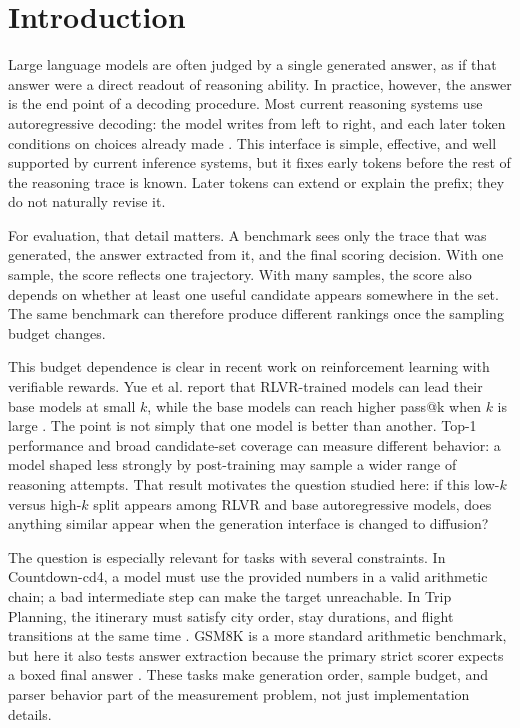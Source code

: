 \section{Introduction}
\label{sec:introduction}

Large language models are often judged by a single generated answer, as if that
answer were a direct readout of reasoning ability. In practice, however, the
answer is the end point of a decoding procedure. Most current reasoning systems
use autoregressive decoding: the model writes from left to right, and each later
token conditions on choices already made
\cite{vaswani2017attention,brown2020language}. This interface is simple,
effective, and well supported by current inference systems, but it fixes early
tokens before the rest of the reasoning trace is known. Later tokens can extend
or explain the prefix; they do not naturally revise it.

For evaluation, that detail matters. A benchmark sees only the trace that was
generated, the answer extracted from it, and the final scoring decision. With
one sample, the score reflects one trajectory. With many samples, the score also
depends on whether at least one useful candidate appears somewhere in the set.
The same benchmark can therefore produce different rankings once the sampling
budget changes.

This budget dependence is clear in recent work on reinforcement learning with
verifiable rewards. Yue et al. report that RLVR-trained models can lead their
base models at small $k$, while the base models can reach higher pass@k when
$k$ is large \cite{yue2025rlvr}. The point is not simply that one model is
better than another. Top-1 performance and broad candidate-set coverage can
measure different behavior: a model shaped less strongly by post-training may
sample a wider range of reasoning attempts. That result motivates the question
studied here: if this low-$k$ versus high-$k$ split appears among RLVR and base
autoregressive models, does anything similar appear when the generation
interface is changed to diffusion?

The question is especially relevant for tasks with several constraints. In
Countdown-cd4, a model must use the provided numbers in a valid arithmetic
chain; a bad intermediate step can make the target unreachable. In Trip
Planning, the itinerary must satisfy city order, stay durations, and flight
transitions at the same time \cite{xie2024travelplanner}. GSM8K is a more
standard arithmetic benchmark, but here it also tests answer extraction because
the primary strict scorer expects a boxed final answer \cite{cobbe2021gsm8k}.
These tasks make generation order, sample budget, and parser behavior part of
the measurement problem, not just implementation details.

